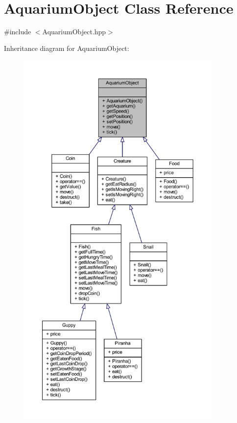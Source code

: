 \hypertarget{class_aquarium_object}{}\section{Aquarium\+Object Class Reference}
\label{class_aquarium_object}


{\ttfamily \#include $<$Aquarium\+Object.\+hpp$>$}



Inheritance diagram for Aquarium\+Object\+:\nopagebreak
\begin{figure}[H]
\begin{center}
\leavevmode
\includegraphics[height=550pt]{class_aquarium_object__inherit__graph}
\end{center}
\end{figure}


